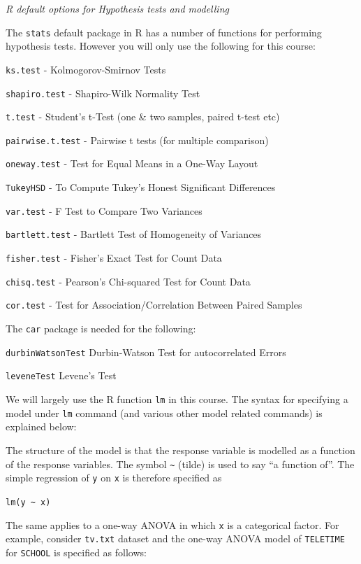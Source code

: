 \documentclass[
  letterpaper,
  DIV=11,
  numbers=noendperiod]{scrreprt}
\begin{document}
\emph{R default options for Hypothesis tests and modelling}

The \texttt{stats} default package in R has a number of functions for
performing hypothesis tests. However you will only use the following for
this course:

\texttt{ks.test} - Kolmogorov-Smirnov Tests

\texttt{shapiro.test} - Shapiro-Wilk Normality Test

\texttt{t.test} - Student's t-Test (one \& two samples, paired t-test
etc)

\texttt{pairwise.t.test} - Pairwise t tests (for multiple comparison)

\texttt{oneway.test} - Test for Equal Means in a One-Way Layout

\texttt{TukeyHSD} - To Compute Tukey's Honest Significant Differences

\texttt{var.test} - F Test to Compare Two Variances

\texttt{bartlett.test} - Bartlett Test of Homogeneity of Variances

\texttt{fisher.test} - Fisher's Exact Test for Count Data

\texttt{chisq.test} - Pearson's Chi-squared Test for Count Data

\texttt{cor.test} - Test for Association/Correlation Between Paired
Samples

The \texttt{car} package is needed for the following:

\texttt{durbinWatsonTest} Durbin-Watson Test for autocorrelated Errors

\texttt{leveneTest} Levene's Test

We will largely use the R function \texttt{lm} in this course. The
syntax for specifying a model under \texttt{lm} command (and various
other model related commands) is explained below:

The structure of the model is that the response variable is modelled as
a function of the response variables. The symbol
\texttt{\textasciitilde{}} (tilde) is used to say ``a function of''. The
simple regression of \texttt{y} on \texttt{x} is therefore specified as

\texttt{lm(y\ \textasciitilde{}\ x)}

The same applies to a one-way ANOVA in which \texttt{x} is a categorical
factor. For example, consider \texttt{tv.txt} dataset and the one-way
ANOVA model of \texttt{TELETIME} for \texttt{SCHOOL} is specified as
follows:
\end{document}
